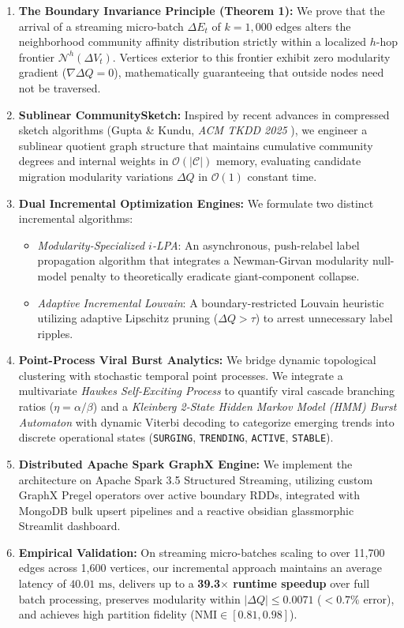 \documentclass[10pt,journal,compsoc]{IEEEtran}
\begin{document}
\begin{enumerate}
    \item \textbf{The Boundary Invariance Principle (Theorem 1):} We prove that the arrival of a streaming micro-batch $\Delta E_t$ of $k = 1,000$ edges alters the neighborhood community affinity distribution strictly within a localized $h$-hop frontier $\mathcal{N}^h(\Delta V_t)$. Vertices exterior to this frontier exhibit zero modularity gradient ($\nabla \Delta Q = 0$), mathematically guaranteeing that outside nodes need not be traversed.
    \item \textbf{Sublinear CommunitySketch:} Inspired by recent advances in compressed sketch algorithms (Gupta \& Kundu, \textit{ACM TKDD 2025} \cite{gupta2025sublinear}), we engineer a sublinear quotient graph structure that maintains cumulative community degrees and internal weights in $\mathcal{O}(|\mathcal{C}|)$ memory, evaluating candidate migration modularity variations $\Delta Q$ in $\mathcal{O}(1)$ constant time.
    \item \textbf{Dual Incremental Optimization Engines:} We formulate two distinct incremental algorithms:
    \begin{itemize}
        \item \textit{Modularity-Specialized $i$-LPA}: An asynchronous, push-relabel label propagation algorithm that integrates a Newman-Girvan modularity null-model penalty to theoretically eradicate giant-component collapse.
        \item \textit{Adaptive Incremental Louvain}: A boundary-restricted Louvain heuristic utilizing adaptive Lipschitz pruning ($\Delta Q > \tau$) to arrest unnecessary label ripples.
    \end{itemize}
    \item \textbf{Point-Process Viral Burst Analytics:} We bridge dynamic topological clustering with stochastic temporal point processes. We integrate a multivariate \textit{Hawkes Self-Exciting Process} to quantify viral cascade branching ratios ($\eta = \alpha/\beta$) and a \textit{Kleinberg 2-State Hidden Markov Model (HMM) Burst Automaton} with dynamic Viterbi decoding to categorize emerging trends into discrete operational states (\texttt{SURGING}, \texttt{TRENDING}, \texttt{ACTIVE}, \texttt{STABLE}).
    \item \textbf{Distributed Apache Spark GraphX Engine:} We implement the architecture on Apache Spark 3.5 Structured Streaming, utilizing custom GraphX Pregel operators over active boundary RDDs, integrated with MongoDB bulk upsert pipelines and a reactive obsidian glassmorphic Streamlit dashboard.
    \item \textbf{Empirical Validation:} On streaming micro-batches scaling to over 11,700 edges across 1,600 vertices, our incremental approach maintains an average latency of $40.01\text{ ms}$, delivers up to a \textbf{39.3$\times$ runtime speedup} over full batch processing, preserves modularity within $|\Delta Q| \le 0.0071$ ($< 0.7\%$ error), and achieves high partition fidelity ($\text{NMI} \in [0.81, 0.98]$).
\end{enumerate}
\end{document}

